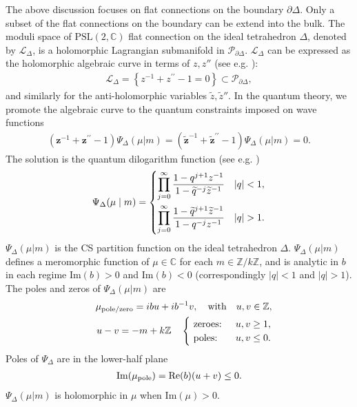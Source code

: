 \documentclass[aps,prd,notitlepage,nofootinbib,superscriptaddress,groupedaddress,twocolumn]{revtex4-1}
\def\C{\mathbb{C}}
\newcommand{\PSlc}{\mathrm{PSL}(2,\mathbb{C})}
\def\be{\begin{eqnarray}}
\def\ee{\end{eqnarray}}
\newcommand{\cl}{\mathcal L}
\newcommand{\calp}{\mathcal P}
\newcommand{\lt}{\left}
\newcommand{\rt}{\right}
\begin{document}
	
The above discussion focuses on flat connections on the boundary $\partial\Delta$. Only a subset of the flat connections on the boundary can be extend into the bulk. The moduli space of $\PSlc$ flat connection on the ideal tetrahedron $\Delta$, denoted by $\cl_\Delta$, is a holomorphic Lagrangian submanifold in $\calp_{\partial\Delta}$. $\cl_\Delta$ can be expressed as the holomorphic algebraic curve in terms of $z,z''$ (see e.g. \cite{Dimofte2011,DGV}):
\be
\mathcal{L}_{\Delta} =\left\{z^{-1}+z^{\prime \prime}-1=0\right\} \subset \mathcal{P}_{\partial \Delta},
\ee
and similarly for the anti-holomorphic variables $\widetilde{z},\widetilde{z}''$. In the quantum theory, we promote the algebraic curve to the quantum constraints imposed on wave functions
\be
\lt(\bm{z}^{-1}+\bm{z}^{\prime \prime}-1\rt)\Psi_\Delta(\mu|m)=\lt(\widetilde{\bm{z}}^{-1}+\widetilde{\bm{z}}^{\prime \prime}-1\rt)\Psi_\Delta(\mu|m)=0.\nonumber
\ee
The solution is the quantum dilogarithm function (see e.g. \cite{levelk,Imamura:2013qxa,Faddeev:1995nb,Kashaev1996hyperbolic})
\be\label{qdilog}
\Psi_\Delta(\mu\mid m)=\begin{dcases}
\prod_{j=0}^{\infty} \frac{1-q^{j+1} z^{-1}}{1-\widetilde{q}^{-j} \widetilde{z}^{-1}} & |q|<1 ,\\
\prod_{j=0}^{\infty} \frac{1-\widetilde{q}^{j+1} \widetilde{z}^{-1}}{1-q^{-j} z^{-1}} & |q|>1 .
\end{dcases}
\ee
$\Psi_\Delta(\mu|m)$ is the CS partition function on the ideal tetrahedron $\Delta$. $\Psi_\Delta(\mu|m)$ defines a meromorphic function of $\mu\in\C$ for each $m\in\mathbb{Z}/k\mathbb{Z}$, and is analytic in $b$ in each regime $\mathrm{Im}(b)>0$ and $\mathrm{Im}(b)<0$ (correspondingly $|q|<1$ and $|q|>1$). The poles and zeros of $\Psi_\Delta(\mu|m)$ are
\be
&&\mu_{\rm pole/zero} =i b u+i b^{-1} v ,\quad\text{with}\quad u,v \in \mathbb{Z}, \nonumber\\ 
&&u-v=-m+ k\mathbb{Z} \quad \begin{cases}
\text { zeroes: } & u,v \geq 1 ,\\
\text { poles: } & u,v \leq 0.
\end{cases}\label{polesmu}
\ee
Poles of $\Psi_{\Delta}$ are in the lower-half plane 
\be
\mathrm{Im}(\mu_{\rm pole})=\mathrm{Re}(b)(u+v)\leq 0.
\ee
$\Psi_{\Delta}(\mu|m)$ is holomorphic in $\mu$ when $\mathrm{Im}(\mu)> 0$.
\end{document}
